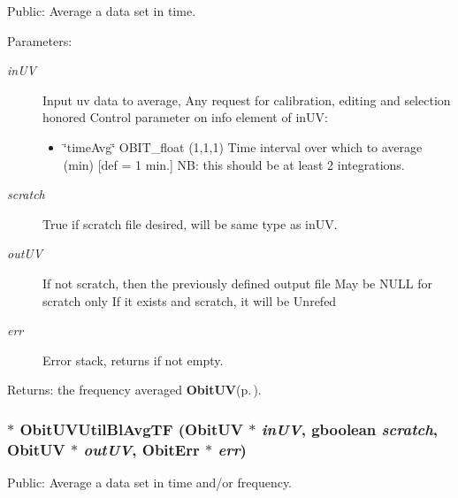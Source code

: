 Public: Average a data set in time. 

\begin{Desc}
\item[Parameters:]
\begin{description}
\item[{\em in\-UV}]Input uv data to average, Any request for calibration, editing and selection honored Control parameter on info element of in\-UV: \begin{itemize}
\item \char`\"{}time\-Avg\char`\"{} OBIT\_\-float (1,1,1) Time interval over which to average (min) [def = 1 min.] NB: this should be at least 2 integrations.\end{itemize}
\item[{\em scratch}]True if scratch file desired, will be same type as in\-UV. \item[{\em out\-UV}]If not scratch, then the previously defined output file May be NULL for scratch only If it exists and scratch, it will be Unrefed \item[{\em err}]Error stack, returns if not empty. \end{description}
\end{Desc}
\begin{Desc}
\item[Returns:]the frequency averaged {\bf Obit\-UV}{\rm (p.\,\pageref{structObitUV})}. \end{Desc}
\subsubsection{$\ast$ Obit\-UVUtil\-Bl\-Avg\-TF ({\bf Obit\-UV} $\ast$ {\em in\-UV}, gboolean {\em scratch}, {\bf Obit\-UV} $\ast$ {\em out\-UV}, {\bf Obit\-Err} $\ast$ {\em err})}\label{ObitUVUtil_8c_a13}


Public: Average a data set in time and/or frequency. 

